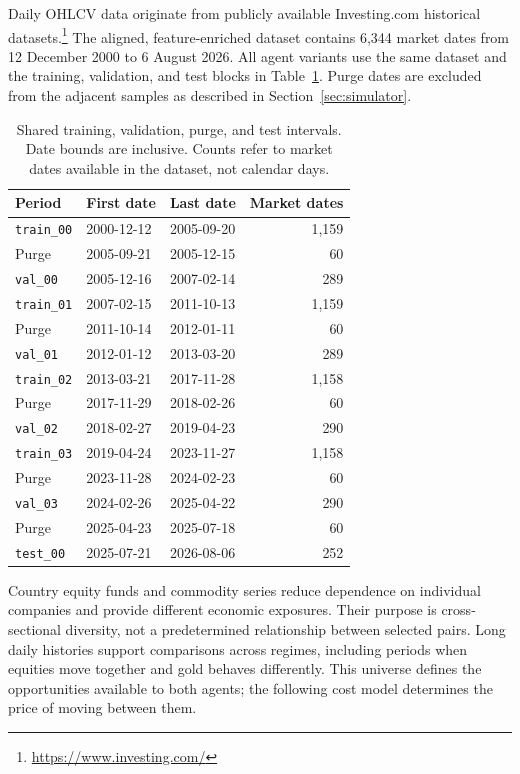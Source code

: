 Daily OHLCV data originate from publicly available Investing.com historical datasets.\footnote{\url{https://www.investing.com/}} The aligned, feature-enriched dataset contains 6,344 market dates from 12 December 2000 to 6 August 2026. All agent variants use the same dataset and the training, validation, and test blocks in Table~\ref{tab:data-blocks}. Purge dates are excluded from the adjacent samples as described in Section~\ref{sec:simulator}.

\begin{table}[htbp]
\centering
\small
\caption{Shared training, validation, purge, and test intervals. Date bounds are inclusive. Counts refer to market dates available in the dataset, not calendar days.}
\label{tab:data-blocks}
\begin{tabular}{@{}lllr@{}}
\toprule
Period & First date & Last date & Market dates \\
\midrule
\texttt{train\_00} & 2000-12-12 & 2005-09-20 & 1,159 \\
Purge & 2005-09-21 & 2005-12-15 & 60 \\
\texttt{val\_00} & 2005-12-16 & 2007-02-14 & 289 \\
\midrule
\texttt{train\_01} & 2007-02-15 & 2011-10-13 & 1,159 \\
Purge & 2011-10-14 & 2012-01-11 & 60 \\
\texttt{val\_01} & 2012-01-12 & 2013-03-20 & 289 \\
\midrule
\texttt{train\_02} & 2013-03-21 & 2017-11-28 & 1,158 \\
Purge & 2017-11-29 & 2018-02-26 & 60 \\
\texttt{val\_02} & 2018-02-27 & 2019-04-23 & 290 \\
\midrule
\texttt{train\_03} & 2019-04-24 & 2023-11-27 & 1,158 \\
Purge & 2023-11-28 & 2024-02-23 & 60 \\
\texttt{val\_03} & 2024-02-26 & 2025-04-22 & 290 \\
\midrule
Purge & 2025-04-23 & 2025-07-18 & 60 \\
\texttt{test\_00} & 2025-07-21 & 2026-08-06 & 252 \\
\bottomrule
\end{tabular}
\end{table}

Country equity funds and commodity series reduce dependence on individual companies and provide different economic exposures. Their purpose is cross-sectional diversity, not a predetermined relationship between selected pairs. Long daily histories support comparisons across regimes, including periods when equities move together and gold behaves differently. This universe defines the opportunities available to both agents; the following cost model determines the price of moving between them.

